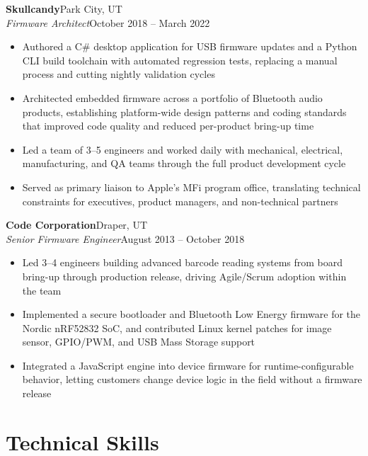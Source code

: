 \documentclass[10.5pt, letterpaper]{article}
\newcommand{\jobentry}[4]{%
  \noindent
  \textbf{\color{accent}#1}\hfill\textcolor{muted}{\small #2}\\
  \textit{#3}\hfill\textcolor{muted}{\small #4}%
}
\begin{document}
\vspace{3pt}

\jobentry{Skullcandy}{Park City, UT}{Firmware Architect}{October 2018 -- March 2022}
\begin{itemize}
  \item Authored a C\# desktop application for USB firmware updates and a Python
        CLI build toolchain with automated regression tests, replacing a manual
        process and cutting nightly validation cycles
  \item Architected embedded firmware across a portfolio of Bluetooth audio
        products, establishing platform-wide design patterns and coding standards
        that improved code quality and reduced per-product bring-up time
  \item Led a team of 3--5 engineers and worked daily with mechanical, electrical,
        manufacturing, and QA teams through the full product development cycle
  \item Served as primary liaison to Apple's MFi program office, translating
        technical constraints for executives, product managers, and non-technical
        partners
\end{itemize}

\vspace{3pt}

\jobentry{Code Corporation}{Draper, UT}{Senior Firmware Engineer}{August 2013 -- October 2018}
\begin{itemize}
  \item Led 3--4 engineers building advanced barcode reading systems from board
        bring-up through production release, driving Agile/Scrum adoption within
        the team
  \item Implemented a secure bootloader and Bluetooth Low Energy firmware for the
        Nordic nRF52832 SoC, and contributed Linux kernel patches for image sensor,
        GPIO/PWM, and USB Mass Storage support
  \item Integrated a JavaScript engine into device firmware for runtime-configurable
        behavior, letting customers change device logic in the field without a
        firmware release
\end{itemize}

\section{Technical Skills}
\end{document}
